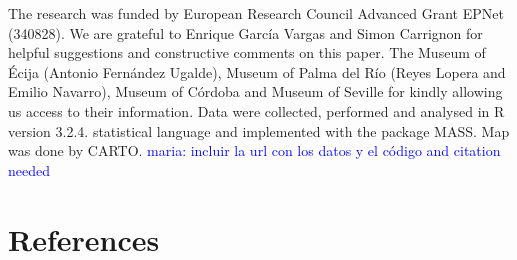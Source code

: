 \documentclass[review]{elsarticle}
\newcommand{\memo}[2]{\textcolor{#1}{#2}}
\newcommand{\maria}[1]{\memo{blue}{maria: #1\\}}
\begin{document}
The research was funded by European Research Council Advanced Grant EPNet (340828). We are grateful to Enrique Garc\'ia Vargas and Simon Carrignon for helpful suggestions and constructive comments on this paper. The Museum of \'Ecija (Antonio Fern\'andez Ugalde), Museum of Palma del R\'io (Reyes Lopera and Emilio Navarro), Museum of C\'ordoba and Museum of Seville for kindly allowing us access to their information.  
Data were collected, performed and analysed in R version 3.2.4. statistical language and implemented with the package MASS. Map was done by CARTO. 
\maria{incluir la url con los datos y el código and citation needed}


\section*{References}

%

\end{document}
